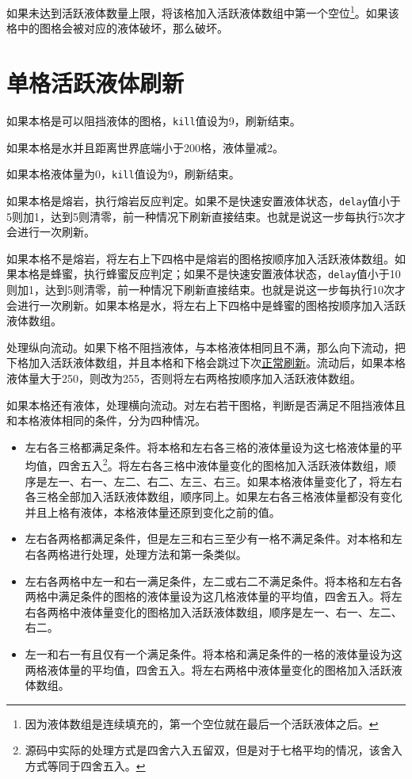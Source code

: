 {如果未达到活跃液体数量上限，将该格加入活跃液体数组中第一个空位\footnote{因为液体数组是连续填充的，第一个空位就在最后一个活跃液体之后。}。如果该格中的图格会被对应的液体破坏，那么破坏。

\section{单格活跃液体刷新}\label{app26}
如果本格是可以阻挡液体的图格，\lstinline{kill}值设为9，刷新结束。

如果本格是水并且距离世界底端小于200格，液体量减2。

如果本格液体量为0，\lstinline{kill}值设为9，刷新结束。

如果本格是熔岩，执行熔岩反应判定。如果不是快速安置液体状态，\lstinline{delay}值小于5则加1，达到5则清零，前一种情况下刷新直接结束。也就是说这一步每执行5次才会进行一次刷新。

如果本格不是熔岩，将左右上下四格中是熔岩的图格按顺序加入活跃液体数组。如果本格是蜂蜜，执行蜂蜜反应判定；如果不是快速安置液体状态，\lstinline{delay}值小于10则加1，达到5则清零，前一种情况下刷新直接结束。也就是说这一步每执行10次才会进行一次刷新。如果本格是水，将左右上下四格中是蜂蜜的图格按顺序加入活跃液体数组。

处理纵向流动。如果下格不阻挡液体，与本格液体相同且不满，那么向下流动，把下格加入活跃液体数组，并且本格和下格会跳过下次\hyperref[app27]{正常刷新}。流动后，如果本格液体量大于250，则改为255，否则将左右两格按顺序加入活跃液体数组。

如果本格还有液体，处理横向流动。对左右若干图格，判断是否满足不阻挡液体且和本格液体相同的条件，分为四种情况。
\begin{itemize}
    \item 左右各三格都满足条件。将本格和左右各三格的液体量设为这七格液体量的平均值，四舍五入\footnote{源码中实际的处理方式是四舍六入五留双，但是对于七格平均的情况，该舍入方式等同于四舍五入。}。将左右各三格中液体量变化的图格加入活跃液体数组，顺序是左一、右一、左二、右二、左三、右三。如果本格液体量变化了，将左右各三格全部加入活跃液体数组，顺序同上。如果左右各三格液体量都没有变化并且上格有液体，本格液体量还原到变化之前的值。
    \item 左右各两格都满足条件，但是左三和右三至少有一格不满足条件。对本格和左右各两格进行处理，处理方法和第一条类似。
    \item 左右各两格中左一和右一满足条件，左二或右二不满足条件。将本格和左右各两格中满足条件的图格的液体量设为这几格液体量的平均值，四舍五入。将左右各两格中液体量变化的图格加入活跃液体数组，顺序是左一、右一、左二、右二。
    \item 左一和右一有且仅有一个满足条件。将本格和满足条件的一格的液体量设为这两格液体量的平均值，四舍五入。将左右两格中液体量变化的图格加入活跃液体数组。
\end{itemize}

}
